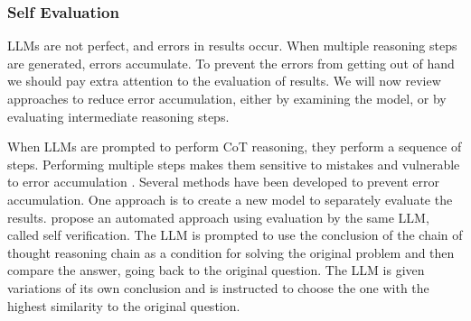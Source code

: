 

\subsubsection{Self Evaluation}
LLMs are not perfect, and errors in results occur. 
When multiple reasoning steps are generated, errors  accumulate. To prevent the errors from getting out of hand we should pay extra attention to the evaluation of results. 
%
We will now review approaches  to reduce error accumulation, either by examining the model, or by evaluating intermediate reasoning steps.



When LLMs are prompted to perform CoT reasoning, they 
perform a sequence of steps. Performing multiple steps makes them  
sensitive to mistakes and vulnerable to error
accumulation %
\citep{weng2022large,xiao2023survey}. Several methods
have been developed to prevent error
accumulation. One approach is to create a new model to separately
evaluate the results. %
%
\citet{weng2022large} propose an automated approach using evaluation by
the same LLM, called self verification. %
The LLM is prompted to use
the conclusion of the chain of thought reasoning chain as a 
condition for solving the original problem and then compare
the answer, going back to the original question. The LLM is given variations of its own conclusion and is instructed to choose the one with the
highest similarity to the original question. %




